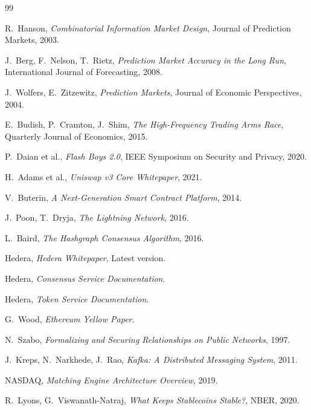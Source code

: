 \documentclass[11pt,a4paper]{article}
\begin{document}
\newpage
\begin{thebibliography}{99}

R.~Hanson,
\textit{Combinatorial Information Market Design},
Journal of Prediction Markets, 2003.

J.~Berg, F.~Nelson, T.~Rietz,
\textit{Prediction Market Accuracy in the Long Run},
International Journal of Forecasting, 2008.

J.~Wolfers, E.~Zitzewitz,
\textit{Prediction Markets},
Journal of Economic Perspectives, 2004.

E.~Budish, P.~Cramton, J.~Shim,
\textit{The High-Frequency Trading Arms Race},
Quarterly Journal of Economics, 2015.

P.~Daian et al.,
\textit{Flash Boys 2.0},
IEEE Symposium on Security and Privacy, 2020.

H.~Adams et al.,
\textit{Uniswap v3 Core Whitepaper}, 2021.

V.~Buterin,
\textit{A Next-Generation Smart Contract Platform}, 2014.

J.~Poon, T.~Dryja,
\textit{The Lightning Network}, 2016.

L.~Baird,
\textit{The Hashgraph Consensus Algorithm}, 2016.

Hedera,
\textit{Hedera Whitepaper}, Latest version.

Hedera,
\textit{Consensus Service Documentation}.

Hedera,
\textit{Token Service Documentation}.

G.~Wood,
\textit{Ethereum Yellow Paper}.

N.~Szabo,
\textit{Formalizing and Securing Relationships on Public Networks}, 1997.

J.~Kreps, N.~Narkhede, J.~Rao,
\textit{Kafka: A Distributed Messaging System}, 2011.

NASDAQ,
\textit{Matching Engine Architecture Overview}, 2019.

R.~Lyons, G.~Viswanath-Natraj,
\textit{What Keeps Stablecoins Stable?}, NBER, 2020.

\end{thebibliography}
\end{document}
